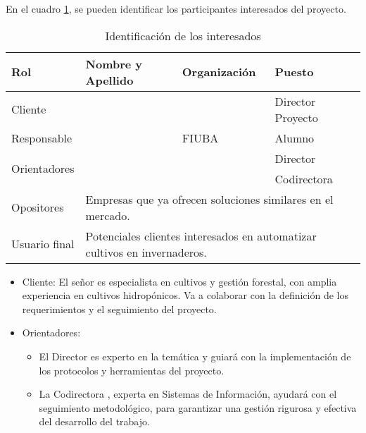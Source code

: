 En el cuadro \ref{tab:interesados}, se pueden identificar los participantes interesados del proyecto.


\begin{table}[ht]
	\begin{tabularx}{\linewidth}{|p{2.15cm}|p{5.8cm}|p{2.85cm}|p{3.4cm}|}
		\hline
		\rowcolor[HTML]{C0C0C0}
		Rol                           & Nombre y Apellido                                                                              & Organización    & Puesto            \\ \hline
		Cliente                       & \clientename                                                                                   & \empclientename & Director Proyecto \\ \hline
		Responsable                   & \authorname                                                                                    & FIUBA           & Alumno            \\ \hline
		\multirow{2}{*}{Orientadores} & \supname                                                                                       & \pertesupname   & Director          \\
		                              & \cosupname                                                                                     & \pertecosupname & Codirectora       \\ \hline
		Opositores                    & \multicolumn{3}{l|}{Empresas que ya ofrecen soluciones similares en el mercado.}                                                     \\ \hline
		Usuario final                 & \multicolumn{3}{l|}{Potenciales clientes interesados en automatizar cultivos en invernaderos.}                                       \\ \hline
	\end{tabularx}
	\caption{Identificación de los interesados}
	\label{tab:interesados}
\end{table}

\begin{itemize}
	\item Cliente: El señor \clientename\hspace{1px} es especialista en cultivos y gestión forestal, con amplia experiencia en
	      cultivos hidropónicos. Va a colaborar con la definición de los requerimientos y el seguimiento del proyecto.
	\item Orientadores:
	      \begin{itemize}
		      \item El Director \supname\hspace{1px} es experto en la temática y guiará con la
		            implementación de los protocolos y herramientas del proyecto.
		      \item La Codirectora \cosupname , experta en Sistemas de Información, ayudará con el
		            seguimiento metodológico, para garantizar una gestión rigurosa y efectiva del
		            desarrollo del trabajo.
	      \end{itemize}
\end{itemize}

